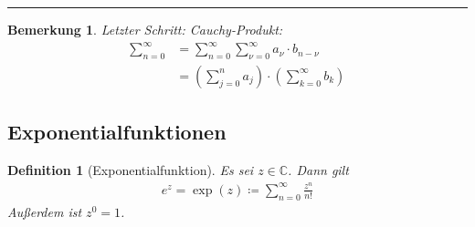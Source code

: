 \documentclass[11pt, twoside, a4paper]{article}
\theoremstyle{plain}
\newtheorem{bemerkung}[blockelement]{Bemerkung}
\newtheorem{definition}[blockelement]{Definition}
\newcommand{\pair}[1]{\left(#1\right)}
\newcommand{\definedas}[0]{\coloneqq}
\newcommand{\C}{\mathbb{C}}
\begin{document}
    \par\noindent\rule{\textwidth}{0.4pt}


    \begin{bemerkung}
        \marginnote{[16. Jan]}
        Letzter Schritt: Cauchy-Produkt:
        \begin{align*}
            \sum_{n=0}^{\infty} &= \sum_{n=0}^{\infty} \sum_{\nu=0}^{\infty} a_{\nu}\cdot b_{n-\nu}\\
            &= \pair{\sum_{j=0}^{n} a_j}\cdot\pair{\sum_{k=0}^{\infty} b_k}
        \end{align*}
    \end{bemerkung}

    \newpage

    \subsection{Exponentialfunktionen}

    \begin{definition}[Exponentialfunktion]
        Es sei $z\in\C$. Dann gilt
        \begin{align*}
            e^z = \exp(z)\definedas \sum_{n=0}^{\infty} \frac{z^n}{n!}
        \end{align*}
        Außerdem ist $z^0=1$.
    \end{definition}
\end{document}
